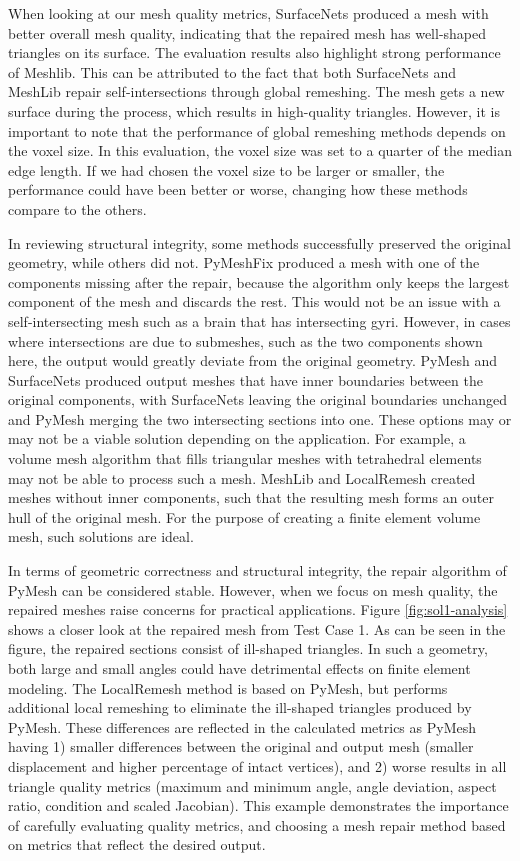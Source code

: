 When looking at our mesh quality metrics, SurfaceNets produced a mesh with better overall mesh quality, indicating that the repaired mesh has well-shaped triangles on its surface. The evaluation results also highlight strong performance of Meshlib. This can be attributed to the fact that both SurfaceNets and MeshLib repair self-intersections through global remeshing. The mesh gets a new surface during the process, which results in high-quality triangles. However, it is important to note that the performance of global remeshing methods depends on the voxel size. In this evaluation, the voxel size was set to a quarter of the median edge length. If we had chosen the voxel size to be larger or smaller, the performance could have been better or worse, changing how these methods compare to the others. 

In reviewing structural integrity, some methods successfully preserved the original geometry, while others did not.  PyMeshFix produced a mesh with one of the components missing after the repair, because the algorithm only keeps the largest component of the mesh and discards the rest. This would not be an issue with a self-intersecting mesh such as a brain that has intersecting gyri. However, in cases where intersections are due to submeshes, such as the two components shown here, the output would greatly deviate from the original geometry. PyMesh and SurfaceNets produced output meshes that have inner boundaries between the original components, with SurfaceNets leaving the original boundaries unchanged and PyMesh merging the two intersecting sections into one. These options may or may not be a viable solution depending on the application. For example, a volume mesh algorithm that fills triangular meshes with tetrahedral elements may not be able to process such a mesh. MeshLib and LocalRemesh created meshes without inner components, such that the resulting mesh forms an outer hull of the original mesh. For the purpose of creating a finite element volume mesh, such solutions are ideal.

In terms of geometric correctness and structural integrity, the repair algorithm of PyMesh can be considered stable. However, when we focus on mesh quality, the repaired meshes raise concerns for practical applications. Figure \ref{fig:sol1-analysis} shows a closer look at the repaired mesh from Test Case 1. As can be seen in the figure, the repaired sections consist of ill-shaped triangles. In such a geometry, both large and small angles could have detrimental effects on finite element modeling. The LocalRemesh method is based on PyMesh, but performs additional local remeshing to eliminate the ill-shaped triangles produced by PyMesh. These differences are reflected in the calculated metrics as PyMesh having 1) smaller differences between the original and output mesh (smaller displacement and higher percentage of intact vertices), and 2) worse results in all triangle quality metrics (maximum and minimum angle, angle deviation, aspect ratio, condition and scaled Jacobian). This example demonstrates the importance of carefully evaluating quality metrics, and choosing a mesh repair method based on metrics that reflect the desired output.

